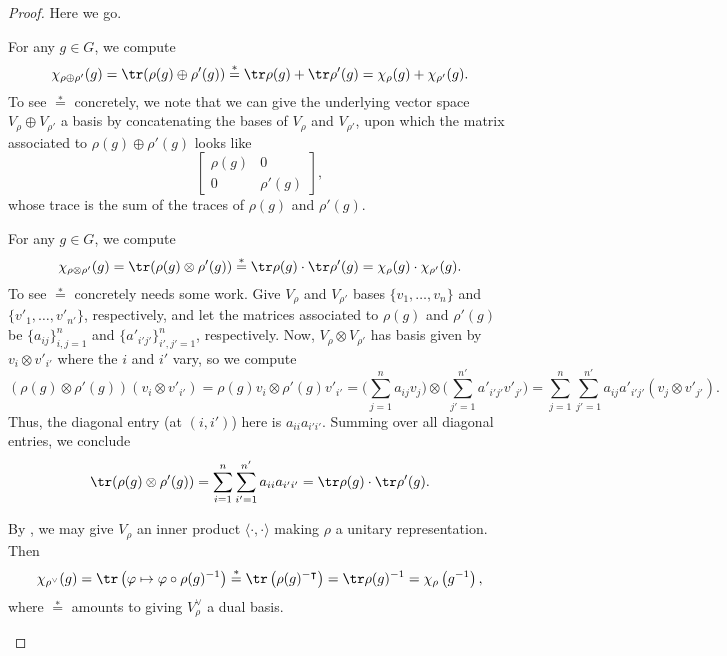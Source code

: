 \documentclass{article}
\begin{document}
\begin{proof}
	Here we go.
	\begin{listalph}
		\item For any $g\in G$, we compute
		\[\chi_{\rho\oplus\rho'}(g)=\tr(\rho(g)\oplus\rho'(g))\stackrel*=\tr\rho(g)+\tr\rho'(g)=\chi_\rho(g)+\chi_{\rho'}(g).\]
		To see $\stackrel*=$ concretely, we note that we can give the underlying vector space $V_\rho\oplus V_{\rho'}$ a basis by concatenating the bases of $V_\rho$ and $V_{\rho'}$, upon which the matrix associated to $\rho(g)\oplus\rho'(g)$ looks like
		\[\begin{bmatrix}
			\rho(g) & 0 \\
			0 & \rho'(g)
		\end{bmatrix},\]
		whose trace is the sum of the traces of $\rho(g)$ and $\rho'(g)$.
		\item For any $g\in G$, we compute
		\[\chi_{\rho\otimes\rho'}(g)=\tr(\rho(g)\otimes\rho'(g))\stackrel*=\tr\rho(g)\cdot\tr\rho'(g)=\chi_\rho(g)\cdot\chi_{\rho'}(g).\]
		To see $\stackrel*=$ concretely needs some work. Give $V_\rho$ and $V_{\rho'}$ bases $\{v_1,\ldots,v_n\}$ and $\{v'_1,\ldots,v'_{n'}\}$, respectively, and let the matrices associated to $\rho(g)$ and $\rho'(g)$ be $\{a_{ij}\}_{i,j=1}^n$ and $\{a'_{i'j'}\}_{i',j'=1}^n$, respectively. Now, $V_\rho\otimes V_{\rho'}$ has basis given by $v_i\otimes v'_{i'}$ where the $i$ and $i'$ vary, so we compute
		\[(\rho(g)\otimes\rho'(g))(v_i\otimes v'_{i'})=\rho(g)v_i\otimes\rho'(g)v'_{i'}=\Bigg(\sum_{j=1}^na_{ij}v_j\Bigg)\otimes\Bigg(\sum_{j'=1}^{n'}a'_{i'j'}v'_{j'}\Bigg)=\sum_{j=1}^n\sum_{j'=1}^{n'}a_{ij}a'_{i'j'}(v_j\otimes v'_{j'}).\]
		Thus, the diagonal entry (at $(i,i')$) here is $a_{ii}a_{i'i'}$. Summing over all diagonal entries, we conclude
		\[\tr(\rho(g)\otimes\rho'(g))=\sum_{i=1}^n\sum_{i'=1}^{n'}a_{ii}a_{i'i'}=\tr\rho(g)\cdot\tr\rho'(g).\]
		\item By , we may give $V_\rho$ an inner product $\langle\cdot,\cdot\rangle$ making $\rho$ a unitary representation. Then
		\[\chi_{\rho^\lor}(g)=\tr\left(\varphi\mapsto\varphi\circ\rho(g)^{-1}\right)\stackrel*=\tr\left(\rho(g)^{-\intercal}\right)=\tr\rho(g)^{-1}=\chi_\rho\left(g^{-1}\right),\]
		where $\stackrel*=$ amounts to giving $V_\rho^\lor$ a dual basis.
		\qedhere
	\end{listalph}
\end{proof}
\end{document}
